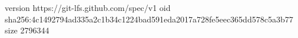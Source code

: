 version https://git-lfs.github.com/spec/v1
oid sha256:4c1492794ad335a2c1b34c1224bad591eda2017a728fe5eec365dd578c5a3b77
size 2796344
